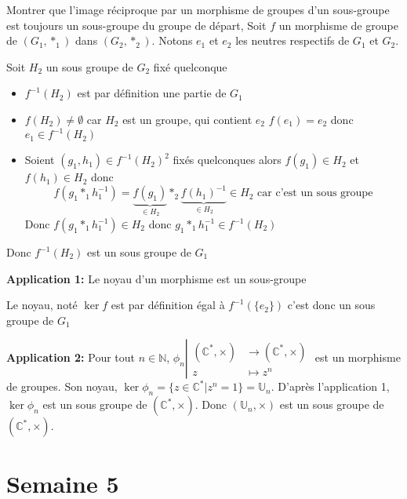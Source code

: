 \documentclass{article}
\renewenvironment{question_kholle}[2][ ]
{
	\subsection{\texorpdfstring{#2}{}}
	\notblank{#1}
	{
		\noindent #1
		\bigbreak
	}
	{}
	\begin{proof}
}
{
	\end{proof}
}
\begin{document}
\begin{question_kholle}{Montrer que l'image réciproque par un morphisme de groupes d'un sous-groupe est toujours un sous-groupe du groupe de départ, }
	Soit $f$ un morphisme de groupe de $(G_{1},*_{1})$ dans $(G_{2}, *_{2})$. Notons $e_{1}$ et $e_{2}$ les neutres respectifs de $G_{1}$ et $G_{2}$.

	Soit $H_{2}$ un sous groupe de $G_{2}$ fixé quelconque
	\begin{itemize}[label=$\star$]
		\item $f^{-1}(H_{2})$ est par définition une partie de $G_{1}$
		\item $f(H_{2}) \neq \emptyset$ car $H_{2}$ est un groupe, qui contient $e_{2}$ $f(e_{1}) = e_{2}$ donc $e_{1} \in f^{-1}(H_{2})$
		\item Soient $(g_{1},h_{1}) \in f^{-1}(H_{2})^{2}$ fixés quelconques
		      alors $f(g_{1}) \in H_{2}$ et $f(h_{1}) \in H_{2}$
		      donc
		      $$
			      f(g_{1} *_{1} h_{1}^{-1}) = \underbrace{ f(g_{1}) }_{ \in H_{2} }*_{2}\underbrace{ f(h_{1})^{-1} }_{ \in H_{2} } \in H_{2} \text{ car c'est un sous groupe}$$
		      Donc $f(g_{1} *_{1} h_{1}^{-1}) \in H_{2}$ donc $g_{1} *_{1} h_{1}^{-1} \in f^{-1}(H_{2})$
	\end{itemize}
	Donc $f^{-1}(H_{2})$ est un sous groupe de $G_{1}$
\end{question_kholle}

\textbf{Application 1:} Le noyau d'un morphisme est un sous-groupe

Le noyau, noté $\ker f$ est par définition égal à $f^{-1}(\{e_2\})$ c'est donc un sous groupe de $G_1$

\textbf{Application 2:} Pour tout $n \in \mathbb{N}$, $\phi _{n}\left|\begin{array}{ll} (\mathbb{C}^{*},\times) &\to (\mathbb{C}^{*},\times) \\ z &\mapsto z^{n} \end{array}\right.$ est un morphisme de groupes. Son noyau, $\ker \phi _n = \{ z \in \mathbb{C}^{*} | z^{n} = 1 \} = \mathbb{U}_{n}$. D'après l'application 1, $\ker \phi_{n}$ est un sous groupe de $(\mathbb{C}^{*}, \times)$. Donc $(\mathbb{U}_{n}, \times)$ est un sous groupe de $(\mathbb{C}^{*},\times)$.
\pagebreak\section{Semaine 5}
\end{document}
